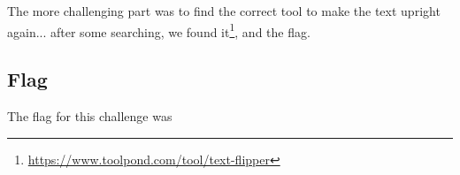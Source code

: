 		The more challenging part was to find the correct tool to make the text upright again... after some searching,
		we found it\footnote{\url{https://www.toolpond.com/tool/text-flipper}}, and the flag.


	\subsection{Flag}
		The flag for this challenge was 

























